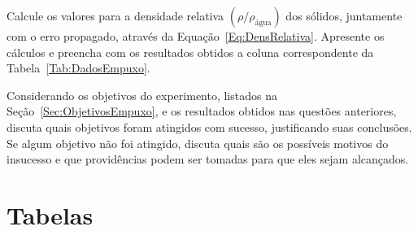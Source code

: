 \begin{question}[type={exam}]
Calcule os valores para a densidade relativa $(\rho/\rho_{\textrm{água}})$ dos sólidos, juntamente com o erro propagado, através da Equação~\ref{Eq:DensRelativa}. Apresente os cálculos e preencha com os resultados obtidos a coluna correspondente da Tabela~\ref{Tab:DadosEmpuxo}. 
\end{question}

\begin{question}[type={exam}]
Considerando os objetivos do experimento, listados na Seção~\ref{Sec:ObjetivosEmpuxo}, e os resultados obtidos nas questões anteriores, discuta quais objetivos foram atingidos com sucesso, justificando suas conclusões. Se algum objetivo não foi atingido, discuta quais são os possíveis motivos do insucesso e que providências podem ser tomadas para que eles sejam alcançados.
\end{question}

\vfill
\pagebreak
\section{Tabelas}

